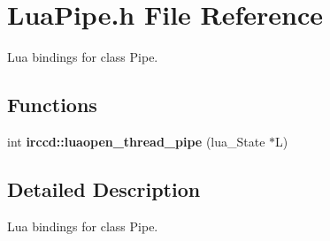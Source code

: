 \hypertarget{a00099}{\section{Lua\-Pipe.\-h File Reference}
\label{a00099}
}


Lua bindings for class Pipe.  


\subsection*{Functions}
\begin{DoxyCompactItemize}
\item 
int {\bfseries irccd\-::luaopen\-\_\-thread\-\_\-pipe} (lua\-\_\-\-State $\ast$L)
\end{DoxyCompactItemize}


\subsection{Detailed Description}
Lua bindings for class Pipe. 